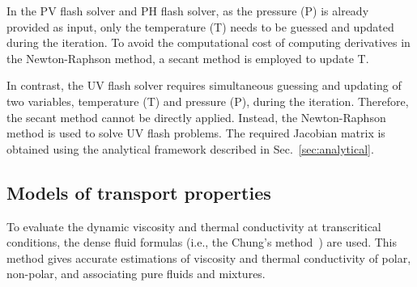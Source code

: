 In the PV flash solver and PH flash solver, as the pressure (P) is already provided as input, only the temperature (T) needs to be guessed and updated during the iteration. To avoid the computational cost of computing derivatives in the Newton-Raphson method, a secant method is employed to update T.


In contrast, the UV flash solver requires simultaneous guessing and updating of two variables,  temperature (T) and pressure (P), during the iteration. Therefore, the secant method cannot be directly applied. Instead, the Newton-Raphson method is used to solve UV flash problems. The required Jacobian matrix is obtained using the analytical framework described in Sec.~\ref{sec:analytical}.



\subsection{Models of transport properties}
To evaluate the dynamic viscosity and thermal conductivity at transcritical conditions, the dense fluid formulas (i.e., the Chung's method~\cite{chung1988generalized}) are used. This method gives accurate estimations of viscosity and thermal conductivity of polar, non-polar, and associating pure fluids and mixtures. 
